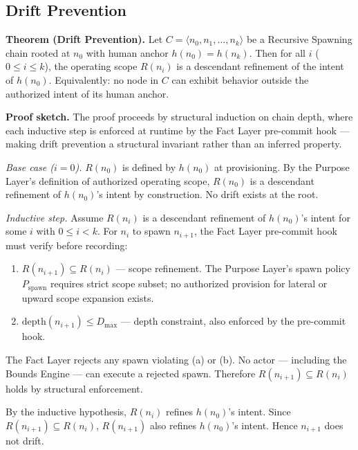 \subsection{Drift Prevention}
\label{sec:rs-drift-prevention}

\medskip
\noindent\textbf{Theorem (Drift Prevention).} Let $C = \langle n_0, n_1, \ldots, n_k \rangle$ be a Recursive Spawning chain rooted at $n_0$ with human anchor $h(n_0) = h(n_k)$. Then for all $i$ ($0 \leq i \leq k$), the operating scope $R(n_i)$ is a descendant refinement of the intent of $h(n_0)$. Equivalently: no node in $C$ can exhibit behavior outside the authorized intent of its human anchor.

\medskip
\noindent\textbf{Proof sketch.} The proof proceeds by structural induction on chain depth, where each inductive step is enforced at runtime by the Fact Layer pre-commit hook — making drift prevention a structural invariant rather than an inferred property.

\medskip
\textit{Base case ($i=0$).} $R(n_0)$ is defined by $h(n_0)$ at provisioning. By the Purpose Layer's definition of authorized operating scope, $R(n_0)$ is a descendant refinement of $h(n_0)$'s intent by construction. No drift exists at the root.

\medskip
\textit{Inductive step.} Assume $R(n_i)$ is a descendant refinement of $h(n_0)$'s intent for some $i$ with $0 \leq i < k$. For $n_i$ to spawn $n_{i+1}$, the Fact Layer pre-commit hook must verify before recording:

\begin{enumerate}
    \item[(a)] $R(n_{i+1}) \subseteq R(n_i)$ — scope refinement. The Purpose Layer's spawn policy $P_{\mathrm{spawn}}$ requires strict scope subset; no authorized provision for lateral or upward scope expansion exists.
    \item[(b)] $\text{depth}(n_{i+1}) \leq D_{\max}$ — depth constraint, also enforced by the pre-commit hook.
\end{enumerate}

The Fact Layer rejects any spawn violating (a) or (b). No actor — including the Bounds Engine — can execute a rejected spawn. Therefore $R(n_{i+1}) \subseteq R(n_i)$ holds by structural enforcement.

By the inductive hypothesis, $R(n_i)$ refines $h(n_0)$'s intent. Since $R(n_{i+1}) \subseteq R(n_i)$, $R(n_{i+1})$ also refines $h(n_0)$'s intent. Hence $n_{i+1}$ does not drift.

